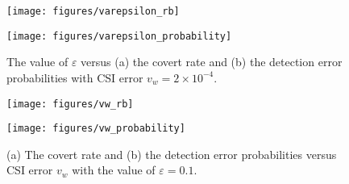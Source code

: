\documentclass[10pt,journal,letterpaper,twocolumn,twoside]{IEEEtran} %
\begin{document}
%
%
\begin{figure}
    \begin{minipage}[b]{0.45\textwidth}
      \centering
      \texttt{[image: figures/varepsilon\_rb]}
      \vskip-0.2cm
    \end{minipage}
     \begin{minipage}[b]{0.45\textwidth}
      \centering
      \texttt{[image: figures/varepsilon\_probability]}
      \vskip-0.2cm
    \end{minipage}\hfill
 \caption{The value of $\varepsilon$ versus (a) the covert rate and (b) the detection error probabilities  with CSI error   $v_w={2} \times {10}^{- 4}$.}
 \label{fig5}  %
\end{figure}
%
%
\begin{figure}
    \begin{minipage}[b]{0.45\textwidth}
      \centering
      \texttt{[image: figures/vw\_rb]}
      \vskip-0.2cm
    \end{minipage}
     \begin{minipage}[b]{0.45\textwidth}
      \centering
      \texttt{[image: figures/vw\_probability]}
      \vskip-0.2cm
    \end{minipage}\hfill
 \caption{(a) The covert rate and (b) the detection error probabilities
versus CSI error $v_w$ with the value of $\varepsilon=0.1$.
  }
 \label{fig6}  %
\end{figure}
\end{document}
